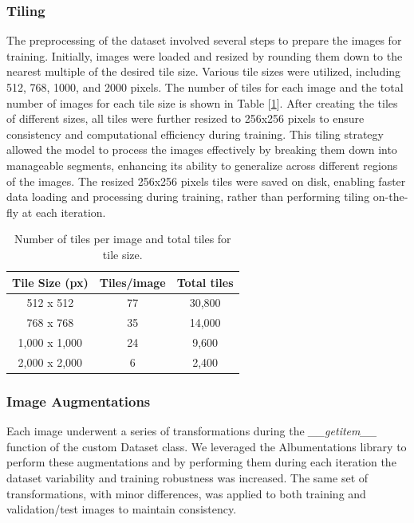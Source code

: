 \documentclass[a4paper]{article}
\begin{document}
\subsubsection{Tiling}
The preprocessing of the dataset involved several steps to prepare the images for training. Initially, images were loaded and resized by rounding them down to the nearest multiple of the desired tile size. Various tile sizes were utilized, including 512, 768, 1000, and 2000 pixels. The number of tiles for each image and the total number of images for each tile size is shown in Table [\ref{table:number_of_tiles_and_total_tiles}]. After creating the tiles of different sizes, all tiles were further resized to 256x256 pixels to ensure consistency and computational efficiency during training. This tiling strategy allowed the model to process the images effectively by breaking them down into manageable segments, enhancing its ability to generalize across different regions of the images. The resized 256x256 pixels tiles were saved on disk, enabling faster data loading and processing during training, rather than performing tiling on-the-fly at each iteration.

\begin{table}[h]
    \centering
    \begin{tabular}{|c|c|c|}
    \hline
    \textbf{Tile Size (px)} & \textbf{Tiles/image} & \textbf{Total tiles} \\ \hline
    512 x 512 & 77 & 30,800 \\ \hline
    768 x 768 & 35 & 14,000 \\ \hline
    1,000 x 1,000 & 24 & 9,600 \\ \hline
    2,000 x 2,000 & 6 & 2,400 \\ \hline
    \end{tabular}
    \caption{Number of tiles per image and total tiles for tile size.}
    \label{table:number_of_tiles_and_total_tiles}
\end{table}

\subsubsection{Image Augmentations}
Each image underwent a series of transformations during the \textit{\_\_getitem\_\_} function of the custom Dataset class. We leveraged the Albumentations library to perform these augmentations and by performing them during each iteration the dataset variability and training robustness was increased. The same set of transformations, with minor differences, was applied to both training and validation/test images to maintain consistency.
\end{document}

